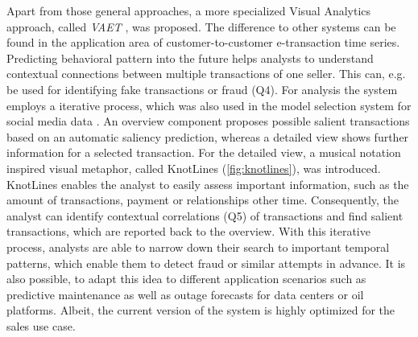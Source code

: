 \documentclass[electronic]{vgtc}             %
\begin{document}
Apart from those general approaches, a more specialized Visual Analytics approach, called \textit{VAET}  \cite{Xie:2014}, was proposed.
The difference to other systems can be found in the application area of customer-to-customer e-transaction time series.
Predicting behavioral pattern into the future helps analysts to understand contextual connections between multiple transactions of one seller.
This can, e.g. be used for identifying fake transactions or fraud (Q4).
For analysis the system employs a iterative process, which was also used in the model selection system for social media data \cite{koepp:2014}.
An overview component proposes possible salient transactions based on an automatic saliency prediction, whereas a detailed view shows further information for a selected transaction.
For the detailed view, a musical notation inspired visual metaphor, called KnotLines (\autoref{fig:knotlines}), was introduced.
KnotLines enables the analyst to easily assess important information, such as the amount of transactions, payment or relationships other time. 
Consequently, the analyst can identify contextual correlations (Q5) of transactions and find salient transactions, which are reported back to the overview. 
With this iterative process, analysts are able to narrow down their search to important temporal patterns, which enable them to detect fraud or similar attempts in advance. 
It is also possible, to adapt this idea to different application scenarios such as predictive maintenance as well as outage forecasts for data centers or oil platforms.
Albeit, the current version of the system is highly optimized for the sales use case. 
\end{document}
